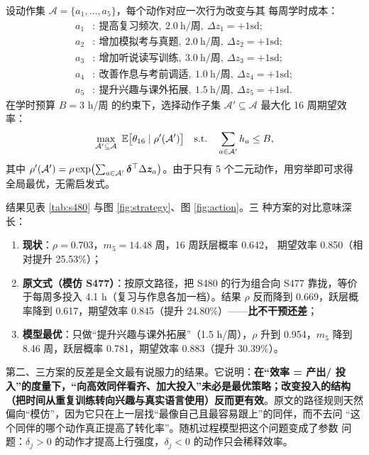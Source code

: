 设动作集 $\mathcal{A}=\{a_1,\dots,a_5\}$，每个动作对应一次行为改变与其
每周学时成本：
\begin{align*}
a_1&:\ \text{提高复习频次},\ 2.0\ \text{h/周},\ \Delta z_1=+1\text{sd};\\
a_2&:\ \text{增加模拟考与真题},\ 2.0\ \text{h/周},\ \Delta z_2=+1\text{sd};\\
a_3&:\ \text{增加听说读写训练},\ 3.0\ \text{h/周},\ \Delta z_3=+1\text{sd};\\
a_4&:\ \text{改善作息与考前调适},\ 1.0\ \text{h/周},\ \Delta z_4=+1\text{sd};\\
a_5&:\ \text{提升兴趣与课外拓展},\ 1.5\ \text{h/周},\ \Delta z_5=+1\text{sd}.
\end{align*}
在学时预算 $B=3$ h/周 的约束下，选择动作子集 $\mathcal{A}'\subseteq
\mathcal{A}$ 最大化 16 周期望效率：
\begin{equation}
\max_{\mathcal{A}'\subseteq\mathcal{A}}\
\mathbb{E}\bigl[\theta_{16}\mid \rho'(\mathcal{A}')\bigr]
\quad\text{s.t.}\quad
\sum_{a\in\mathcal{A}'}h_a\le B,
\label{eq:opt}
\end{equation}
其中 $\rho'(\mathcal{A}')=\rho\exp\bigl(\sum_{a\in\mathcal{A}'}
\bm{\delta}^{\top}\Delta\bm{z}_a\bigr)$。由于只有 5 个二元动作，用穷举即可求得
全局最优，无需启发式。

结果见表 \ref{tab:s480} 与图 \ref{fig:strategy}、图 \ref{fig:action}。三
种方案的对比意味深长：

\begin{enumerate}[label=（\arabic*）,itemsep=2pt,topsep=2pt,leftmargin=3em]
\item \textbf{现状}：$\rho=0.703$，$m_5=14.48$ 周，16 周跃层概率 0.642，
  期望效率 0.850（相对提升 25.53\%）；
\item \textbf{原文式（模仿 S477）}：按原文路径，把 S480 的行为组合向 S477
  靠拢，等价于每周多投入 4.1 h（复习与作息各加一档）。结果
  $\rho$ 反而降到 0.669，跃层概率降到 0.617，期望效率 0.845（提升
  24.80\%）——\textbf{比不干预还差}；
\item \textbf{模型最优}：只做“提升兴趣与课外拓展”（1.5 h/周），$\rho$ 升到
  0.954，$m_5$ 降到 8.46 周，跃层概率 0.781，期望效率 0.883（提升
  30.39\%）。
\end{enumerate}

第二、三方案的反差是全文最有说服力的结果。它说明：\textbf{在“效率 = 产出/
投入”的度量下，“向高效同伴看齐、加大投入”未必是最优策略；改变投入的结构
（把时间从重复训练转向兴趣与真实语言使用）反而更有效}。原文的路径规则天然
偏向“模仿”，因为它只在上一层找“最像自己且最容易跟上”的同伴，而不去问
“这个同伴的哪个动作真正提高了转化率”。随机过程模型把这个问题变成了参数
问题：$\delta_j>0$ 的动作才提高上行强度，$\delta_j<0$ 的动作只会稀释效率。


